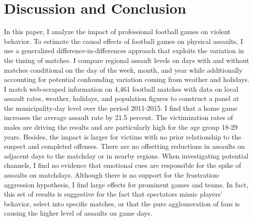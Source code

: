 









\bigskip
\section{Discussion and Conclusion}\label{sec_soc_ext:conclusion}

In this paper, I analyze the impact of professional football games on violent behavior. To estimate the causal effects of football games on physical assaults, I use a generalized difference-in-differences approach that exploits the variation in the timing of matches. I compare regional assault levels on days with and without matches conditional on the day of the week, month, and year while additionally accounting for potential confounding variation coming from weather and holidays. I match web-scraped information on 4,461 football matches with data on local assault rates, weather, holidays, and population figures to construct a panel at the municipality-day level over the period 2011-2015. I find that a home game increases the average assault rate by 21.5 percent. The victimization rates of males are driving the results and are particularly high for the age group 18-29 years. Besides, the impact is 
larger for victims with no prior relationship to the suspect and completed offenses. There are no offsetting reductions in assaults on adjacent days to the matchday or in nearby regions. When investigating potential channels, I find no evidence that emotional cues are responsible for the spike of assaults on matchdays. Although there is no support for the frustration-aggression hypothesis, I find large effects for prominent games and teams. In fact, this set of results is suggestive for the fact that spectators mimic players' behavior, select into specific matches, or that the pure agglomeration of fans is causing the higher level of assaults on game days. 




